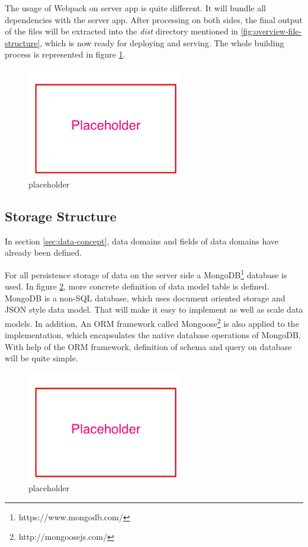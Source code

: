 The usage of Webpack on server app is quite different. It will bundle all dependencies with the server app. After processing on both sides, the final output of the files will be extracted into the \textit{dist} directory mentioned in \ref{fig:overview-file-structure}, which is now ready for deploying and serving. The whole building process is represented in figure \ref{fig:automated-building-imp}.

\begin{figure}[!htbp]
  \centering
    \includegraphics[width=0.6\textwidth]{Figures/placeholder.png}
  \caption{placeholder}
  \label{fig:automated-building-imp}
\end{figure}

\subsection{Storage Structure} \label{subsec:storage-structure-imp}
In section \ref{sec:data-concept}, data domains and fields of data domains  have already been defined. 

For all persistence storage of data on the server side a MongoDB\footnote{https://www.mongodb.com/} database is used.  In figure \ref{fig:data-model-table-imp}, more concrete definition of data model table is defined. MongoDB is a non-SQL database, which uses document oriented storage and JSON style data model. That will make it easy to implement as well as scale data models. In addition, An \gls{ORM} framework called Mongoose\footnote{http://mongoosejs.com/} is also applied to the implementation, which encapsulates the native database operations of MongoDB. With help of the \gls{ORM} framework, definition of schema and query on database will be quite simple. 


\begin{figure}[!htbp]
  \centering
    \includegraphics[width=0.6\textwidth]{Figures/placeholder.png}
  \caption{placeholder}
  \label{fig:data-model-table-imp}
\end{figure}
